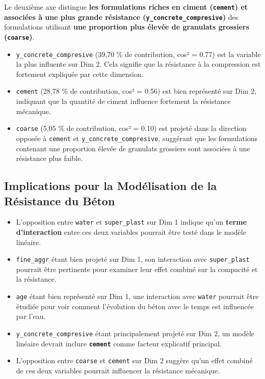 \documentclass[
  12pt,
]{article}
\providecommand{\tightlist}{%
  \setlength{\itemsep}{0pt}\setlength{\parskip}{0pt}}
\begin{document}
Le deuxième axe distingue \textbf{les formulations riches en ciment
(\texttt{cement}) et associées à une plus grande résistance
(\texttt{y\_concrete\_compresive})} des formulations utilisant
\textbf{une proportion plus élevée de granulats grossiers
(\texttt{coarse})}.

\begin{itemize}
\tightlist
\item
  \texttt{y\_concrete\_compresive} (39,70 \% de contribution, cos² =
  0.77) est la variable la plus influente sur Dim 2. Cela signifie que
  la résistance à la compression est fortement expliquée par cette
  dimension.
\item
  \texttt{cement} (28,78 \% de contribution, cos² = 0.56) est bien
  représenté sur Dim 2, indiquant que la quantité de ciment influence
  fortement la résistance mécanique.
\item
  \texttt{coarse} (5,05 \% de contribution, cos² = 0.10) est projeté
  dans la direction opposée à \texttt{cement} et
  \texttt{y\_concrete\_compresive}, suggérant que les formulations
  contenant une proportion élevée de granulats grossiers sont associées
  à une résistance plus faible.
\end{itemize}

\subsection{Implications pour la Modélisation de la Résistance du
Béton}\label{implications-pour-la-moduxe9lisation-de-la-ruxe9sistance-du-buxe9ton}

\begin{itemize}
\tightlist
\item
  L'opposition entre \texttt{water} et \texttt{super\_plast} sur Dim 1
  indique qu'un \textbf{terme d'interaction} entre ces deux variables
  pourrait être testé dans le modèle linéaire.
\item
  \texttt{fine\_aggr} étant bien projeté sur Dim 1, son interaction avec
  \texttt{super\_plast} pourrait être pertinente pour examiner leur
  effet combiné sur la compacité et la résistance.
\item
  \texttt{age} étant bien représenté sur Dim 1, une interaction avec
  \texttt{water} pourrait être étudiée pour voir comment l'évolution du
  béton avec le temps est influencée par l'eau.
\item
  \texttt{y\_concrete\_compresive} étant principalement projeté sur Dim
  2, un modèle linéaire devrait inclure \textbf{\texttt{cement}} comme
  facteur explicatif principal.
\item
  L'opposition entre \texttt{coarse} et \texttt{cement} sur Dim 2
  suggère qu'un effet combiné de ces deux variables pourrait influencer
  la résistance mécanique.
\end{itemize}
\end{document}
